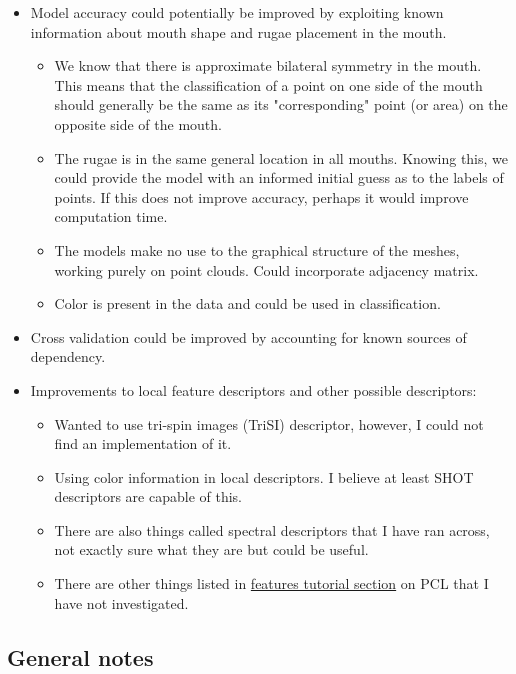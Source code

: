 \documentclass[11pt]{article}
\theoremstyle{definition}
\begin{document}
\begin{itemize}
    \item Model accuracy could potentially be improved by exploiting known information about mouth shape and rugae placement in the mouth. 
    \begin{itemize}
        \item We know that there is approximate bilateral symmetry in the mouth. This means that the classification of a point on one side of the mouth should generally be the same as its "corresponding" point (or area) on the opposite side of the mouth. 
        \item The rugae is in the same general location in all mouths. Knowing this, we could provide the model with an informed initial guess as to the labels of points. If this does not improve accuracy, perhaps it would improve computation time.
        \item The models make no use to the graphical structure of the meshes, working purely on point clouds. Could incorporate adjacency matrix.
        \item Color is present in the data and could be used in classification.
    \end{itemize}
    \item Cross validation could be improved by accounting for known sources of dependency.
    \item Improvements to local feature descriptors and other possible descriptors:
    \begin{itemize}
        \item Wanted to use tri-spin images (TriSI) descriptor, however, I could not find an implementation of it.
        \item Using color information in local descriptors. I believe at least SHOT descriptors are capable of this.
        \item There are also things called spectral descriptors that I have ran across, not exactly sure what they are but could be useful.
        \item There are other things listed in \href{https://pcl.readthedocs.io/projects/tutorials/en/master/#features}{features tutorial section} on PCL that I have not investigated.
    \end{itemize}
\end{itemize}


\subsection{General notes}
\end{document}

